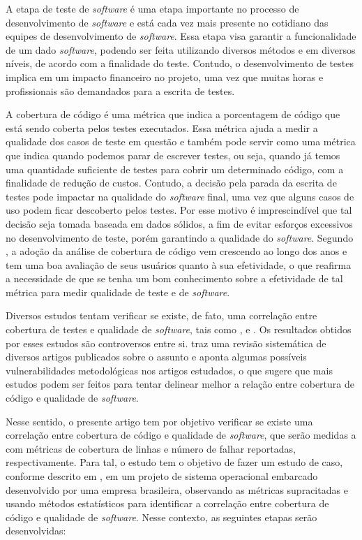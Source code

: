 \documentclass[11.5pt]{article}
\begin{document}
A etapa de teste de \textit{software} é uma etapa importante no processo de desenvolvimento de
\textit{software} e está cada vez mais presente no cotidiano das equipes de desenvolvimento de
\textit{software}.
Essa etapa visa garantir a funcionalidade de um dado \textit{software}, podendo ser feita utilizando
diversos métodos e em diversos níveis, de acordo com a finalidade do teste.
Contudo, o desenvolvimento de testes implica em um impacto financeiro no projeto, uma vez que muitas
horas e profissionais são demandados para a escrita de testes.

A cobertura de código é uma métrica que indica a porcentagem de código que está sendo coberta pelos
testes executados.
Essa métrica ajuda a medir a qualidade dos casos de teste em questão e também pode servir como uma
métrica que indica quando podemos parar de escrever testes, ou seja, quando já temos uma quantidade
suficiente de testes para cobrir um determinado código, com a finalidade de redução de custos.
Contudo, a decisão pela parada da escrita de testes pode impactar na qualidade do \textit{software}
final, uma vez que alguns casos de uso podem ficar descoberto pelos testes.
Por esse motivo é imprescindível que tal decisão seja tomada baseada em dados sólidos, a fim de
evitar esforços excessivos no desenvolvimento de teste, porém garantindo a qualidade do
\textit{software}.
Segundo \cite{coverageAtGoogle}, a adoção da análise de cobertura de código vem crescendo ao longo
dos anos e tem uma boa avaliação de seus usuários quanto à sua efetividade, o que reafirma a
necessidade de que se tenha um bom conhecimento sobre a efetividade de tal métrica para medir
qualidade de teste e de \textit{software}.

Diversos estudos tentam verificar se existe, de fato, uma correlação entre cobertura de testes e
qualidade de \textit{software}, tais como \cite{coverageMetaAnalysis}, \cite{unitTestedCrash} e
\cite{coverageLargeScaleStudy}.
Os resultados obtidos por esses estudos são controversos entre si.
\cite{coverageMetaAnalysis} traz uma revisão sistemática de diversos artigos publicados sobre o
assunto e aponta algumas possíveis vulnerabilidades metodológicas nos artigos estudados, o que
sugere que mais estudos podem ser feitos para tentar delinear melhor a relação entre cobertura de
código e qualidade de \textit{software}.

Nesse sentido, o presente artigo tem por objetivo verificar se existe uma correlação entre cobertura
de código e qualidade de \textit{software}, que serão medidas a com métricas de cobertura de linhas
e número de falhar reportadas, respectivamente.
Para tal, o estudo tem o objetivo de fazer um estudo de caso, conforme descrito em
\cite{metodosPesquisa}, em um projeto de sistema operacional embarcado desenvolvido por uma empresa
brasileira, observando as métricas supracitadas e usando métodos estatísticos para identificar a
correlação entre cobertura de código e qualidade de \textit{software}.
Nesse contexto, as seguintes etapas serão desenvolvidas:
\end{document}
